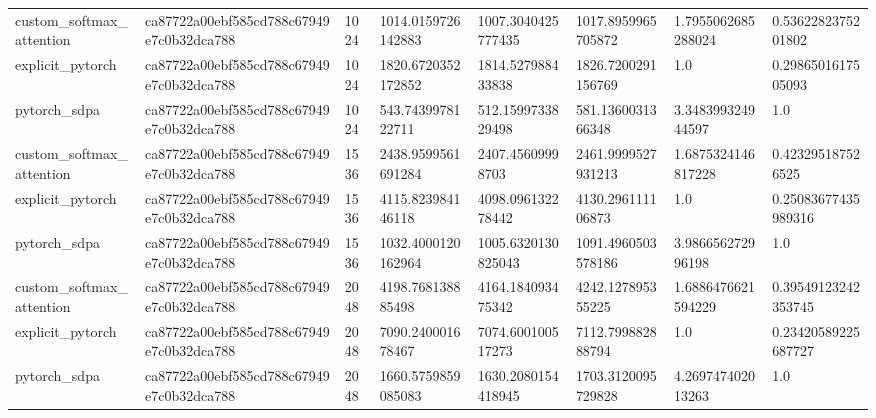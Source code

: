 \begin{tabular}{llllllll}
custom\_softmax\_attention & ca87722a00ebf585cd788c67949e7c0b32dca788 & 1024 & 1014.0159726142883 & 1007.3040425777435 & 1017.8959965705872 & 1.7955062685288024 & 0.5362282375201802 \\
explicit\_pytorch & ca87722a00ebf585cd788c67949e7c0b32dca788 & 1024 & 1820.6720352172852 & 1814.527988433838 & 1826.7200291156769 & 1.0 & 0.2986501617505093 \\
pytorch\_sdpa & ca87722a00ebf585cd788c67949e7c0b32dca788 & 1024 & 543.7439978122711 & 512.1599733829498 & 581.1360031366348 & 3.348399324944597 & 1.0 \\
custom\_softmax\_attention & ca87722a00ebf585cd788c67949e7c0b32dca788 & 1536 & 2438.9599561691284 & 2407.45609998703 & 2461.9999527931213 & 1.6875324146817228 & 0.423295187526525 \\
explicit\_pytorch & ca87722a00ebf585cd788c67949e7c0b32dca788 & 1536 & 4115.823984146118 & 4098.096132278442 & 4130.296111106873 & 1.0 & 0.25083677435989316 \\
pytorch\_sdpa & ca87722a00ebf585cd788c67949e7c0b32dca788 & 1536 & 1032.4000120162964 & 1005.6320130825043 & 1091.4960503578186 & 3.986656272996198 & 1.0 \\
custom\_softmax\_attention & ca87722a00ebf585cd788c67949e7c0b32dca788 & 2048 & 4198.768138885498 & 4164.184093475342 & 4242.127895355225 & 1.6886476621594229 & 0.39549123242353745 \\
explicit\_pytorch & ca87722a00ebf585cd788c67949e7c0b32dca788 & 2048 & 7090.240001678467 & 7074.600100517273 & 7112.799882888794 & 1.0 & 0.23420589225687727 \\
pytorch\_sdpa & ca87722a00ebf585cd788c67949e7c0b32dca788 & 2048 & 1660.5759859085083 & 1630.2080154418945 & 1703.3120095729828 & 4.269747402013263 & 1.0 \\
\hline
\end{tabular}
